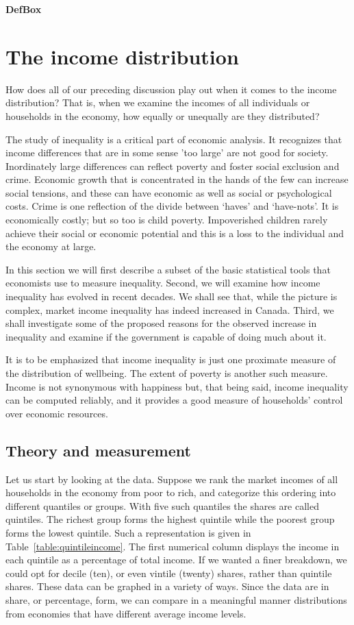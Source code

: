 \textbf{{DefBox}}\section{The income distribution}\label{sec:ch13sec7}

How does all of our preceding discussion play out when it comes to the income distribution? That is, when we examine the incomes of all individuals or households in the economy, how equally or unequally are they distributed?

The study of inequality is a critical part of economic analysis. It recognizes that income differences that are in some sense 'too large' are not good for society. Inordinately large differences can reflect poverty and foster social exclusion and crime. Economic growth that is concentrated in the hands of the few can increase social tensions, and these can have economic as well as social or psychological costs. Crime is one reflection of the divide between `haves' and `have-nots'. It is economically costly; but so too is child poverty. Impoverished children rarely achieve their social or economic potential and this is a loss to the individual and the economy at large. 

In this section we will first describe a subset of the basic statistical tools that economists use to measure inequality. Second, we will examine how income inequality has evolved in recent decades. We shall see that, while the picture is complex, market income inequality has indeed increased in Canada. Third, we shall investigate some of the proposed reasons for the observed increase in inequality and examine if the government is capable of doing much about it.

It is to be emphasized that income inequality is just one proximate measure of the distribution of wellbeing. The extent of poverty is another such measure. Income is not synonymous with happiness but, that being said, income inequality can be computed reliably, and it provides a good measure of households' control over economic resources.

\subsection*{Theory and measurement}

Let us start by looking at the data. Suppose we rank the market incomes of all households in the economy from poor to rich, and categorize this ordering into different quantiles or groups. With five such quantiles the shares are called quintiles. The richest group forms the highest quintile while the poorest group forms the lowest quintile. Such a representation is given in Table~\ref{table:quintileincome}. The first numerical column displays the income in each quintile as a percentage of total income. If we wanted a finer breakdown, we could opt for decile (ten), or even vintile (twenty) shares, rather than quintile shares. These data can be graphed in a variety of ways. Since the data are in share, or percentage, form, we can compare in a meaningful manner distributions from economies that have different average income levels.

